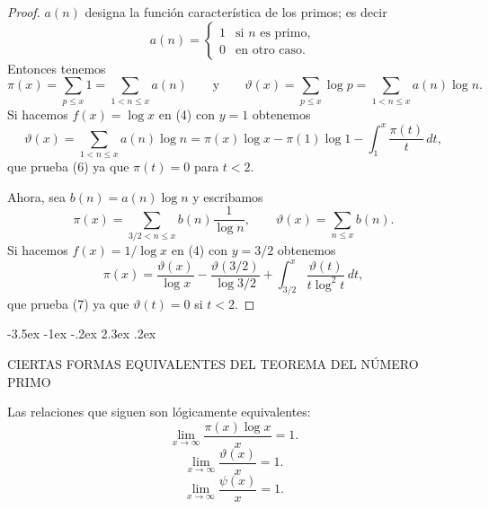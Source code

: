 \documentclass[12pt,a4paper]{book}
\makeatletter
\renewcommand\section{\@startsection{section}{1}{\z@}%
  {-3.5ex \@plus -1ex \@minus -.2ex}%
  {2.3ex \@plus .2ex}%
  {\normalfont\Large\bfseries\raggedright}}
\makeatother
\begin{document}
    \begin{proof}
        $a(n)$ designa la función característica de los primos; es decir
        \begin{equation*}
            a(n)=
            \begin{cases}
                1 & \text{si } n \text{ es primo},\\
                0 & \text{en otro caso}.
            \end{cases}
        \end{equation*}
        Entonces tenemos
        \begin{equation*}
            \pi(x)=\sum_{p\leq x}1=\sum_{1<n\leq x}a(n)\qquad\text{y}\qquad
            \vartheta(x)=\sum_{p\leq x}\log p=\sum_{1<n\leq x}a(n)\log n.
        \end{equation*}
        Si hacemos $f(x)=\log x$ en (4) con $y=1$ obtenemos
        \begin{equation*}
            \vartheta(x)=\sum_{1<n\leq x}a(n)\log n=\pi(x)\log x-\pi(1)\log1-\int_{1}^{x}\frac{\pi(t)}{t}\,dt,
        \end{equation*}
        que prueba (6) ya que $\pi(t)=0$ para $t<2$.

        Ahora, sea $b(n)=a(n)\log n$ y escribamos
        \begin{equation*}
            \pi(x)=\sum_{3/2<n\leq x}b(n)\frac{1}{\log n},\qquad \vartheta(x)=\sum_{n\leq x}b(n).
        \end{equation*}
        Si hacemos $f(x)=1/\log x$ en (4) con $y=3/2$ obtenemos
        \begin{equation*}
            \pi(x)=\frac{\vartheta(x)}{\log x}-\frac{\vartheta(3/2)}{\log3/2}
            +\int_{3/2}^{x}\frac{\vartheta(t)}{t\log^{2}t}\,dt,
        \end{equation*}
        que prueba (7) ya que $\vartheta(t)=0$ si $t<2$.
    \end{proof}

    \section{CIERTAS FORMAS EQUIVALENTES DEL TEOREMA DEL NÚMERO PRIMO}

    \begin{teorema}
        Las relaciones que siguen son lógicamente equivalentes:
        \begin{equation}
            \lim_{x\to\infty}\frac{\pi(x)\log x}{x}=1.
        \end{equation}
        \begin{equation}
            \lim_{x\to\infty}\frac{\vartheta(x)}{x}=1.
        \end{equation}
        \begin{equation}
            \lim_{x\to\infty}\frac{\psi(x)}{x}=1.
        \end{equation}
    \end{teorema}
\end{document}
